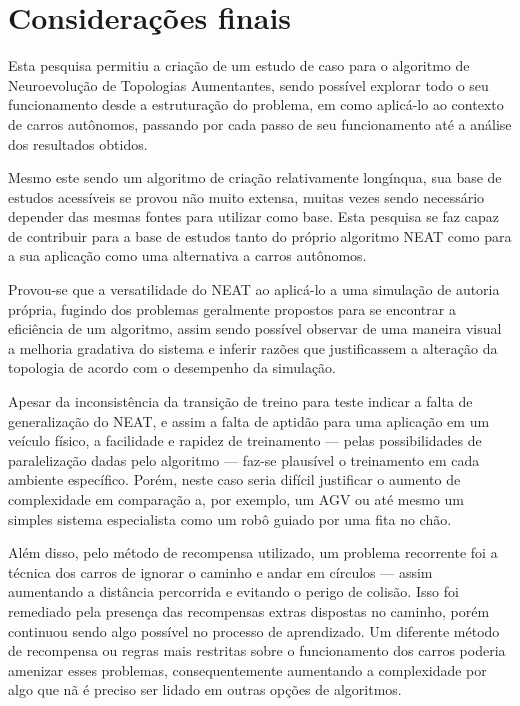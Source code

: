 \chapter{Considerações finais}

Esta pesquisa permitiu a criação de um estudo de caso para o algoritmo de Neuroevolução de Topologias Aumentantes, 
sendo possível explorar todo o seu funcionamento desde a estruturação do problema, em como aplicá-lo ao contexto de 
carros autônomos, passando por cada passo de seu funcionamento até a análise dos resultados obtidos.

Mesmo este sendo um algoritmo de criação relativamente longínqua, sua base de estudos acessíveis se provou não 
muito extensa, muitas vezes sendo necessário depender das mesmas fontes para utilizar como base. Esta pesquisa se 
faz capaz de contribuir para a base de estudos tanto do próprio algoritmo NEAT como para a sua aplicação como uma 
alternativa a carros autônomos.

Provou-se que a versatilidade do NEAT ao aplicá-lo a uma simulação de autoria própria, fugindo dos problemas geralmente 
propostos para se encontrar a eficiência de um algoritmo, assim sendo possível observar de uma maneira visual a melhoria 
gradativa do sistema e inferir razões que justificassem a alteração da topologia de acordo com o desempenho da simulação.

Apesar da inconsist{\^e}ncia da transi{\c
c}{\~a}o de treino para teste indicar a falta de
generaliza{\c c}{\~a}o do NEAT, e assim a falta
de aptid{\~a}o para uma aplica{\c c}{\~a}o em um
ve{\'i}culo f{\'i}sico, a facilidade e rapidez
de treinamento — pelas possibilidades de
paraleliza{\c c}{\~a}o dadas pelo algoritmo — faz-se 
plaus{\'i}vel o treinamento em cada
ambiente espec{\'i}fico. Por{\'e}m, neste caso
seria dif{\'i}cil justificar o aumento de
complexidade em compara{\c c}{\~a}o a, por
exemplo, um AGV ou at{\'e} mesmo um simples
sistema especialista como um rob{\^o} guiado
por uma fita no ch{\~a}o.

Al{\'e}m disso, pelo método de recompensa utilizado, 
um problema recorrente foi a t{\'e}cnica dos carros de 
ignorar o caminho e andar em c{\'i}rculos — assim aumentando 
a dist{\^a}ncia percorrida e evitando o perigo de colis{\~a}o. 
Isso foi remediado pela presen{\c c}a das recompensas extras 
dispostas no caminho, por{\'e}m continuou sendo algo poss{\'i}vel no 
processo de aprendizado. Um diferente m{\'e}todo de recompensa ou 
regras mais restritas sobre o funcionamento dos carros poderia 
amenizar esses problemas, consequentemente aumentando a complexidade 
por algo que n{\~a} {\'e} preciso ser lidado em outras op{\c c}{\~o}es de algoritmos.

